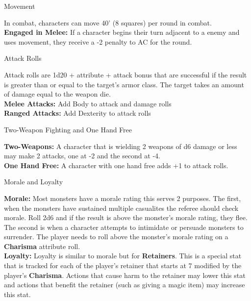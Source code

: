 \documentclass[18pt]{article}
\begin{document}
\begin{multicols}{2}
\begin{mercHeading}
Movement
\end{mercHeading}
In combat, characters can move 40' (8 squares) per round in combat. \\
\textbf{Engaged in Melee:} If a character begins their turn adjacent to a enemy and uses movement, they receive a -2 penalty to AC for the round.

\begin{mercHeading}
Attack Rolls
\end{mercHeading}
\label{label:atkroll}
Attack rolls are 1d20 + attribute + attack bonus that are successful if the result is greater than or equal to the target's armor class. The target takes an amount of damage equal to the weapon die.\\
\textbf{Melee Attacks:} Add Body to attack and damage rolls \\
\textbf{Ranged Attacks:} Add Dexterity to attack rolls

\begin{mercHeading}
Two-Weapon Fighting and One Hand Free
\end{mercHeading}
\textbf{Two-Weapons:} A character that is wielding 2 weapons of d6 damage or less may make 2 attacks, one at -2 and the second at -4. \\
\textbf{One Hand Free:} A character with one hand free adds +1 to attack rolls.


\begin{mercHeading}
Morale and Loyalty
\end{mercHeading}
\textbf{Morale:} Most monsters have a morale rating this serves 2 purposes. The first, when the monsters have sustained multiple casualites the referee should check morale. Roll 2d6 and if the result is above the monster's morale rating, they flee. The second is when a character attempts to intimidate or persuade monsters to surrender. The player needs to roll above the monster's morale rating on a \textbf{Charisma} attribute roll.\\
\textbf{Loyalty:} Loyalty is similar to morale but for \textbf{Retainers}. This is a special stat that is tracked for each of the player's retainer that starts at 7 modified by the player's \textbf{Charisma}. Actions that cause harm to the retainer may lower this stat and actions that benefit the retainer (such as giving a magic item) may increase this stat. 


\end{multicols}
\end{document}
